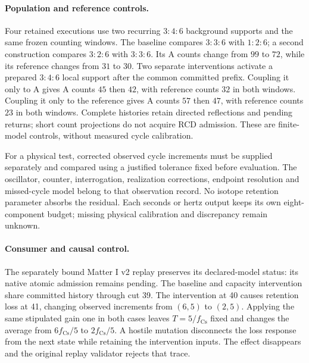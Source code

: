\paragraph{Population and reference controls.}
Four retained executions use two recurring \(3{:}4{:}6\) background supports
and the same frozen counting windows.
The baseline compares \(3{:}3{:}6\) with \(1{:}2{:}6\); a second construction compares
\(3{:}2{:}6\) with \(3{:}3{:}6\). Its A counts change from \(99\) to \(72\), while
its reference changes from \(31\) to \(30\). Two separate interventions
activate a prepared \(3{:}4{:}6\) local support after the common committed prefix.
Coupling it only to A gives A counts \(45\) then \(42\), with reference
counts \(32\) in both windows. Coupling it only to the reference gives A
counts \(57\) then \(47\), with reference counts \(23\) in both windows.
Complete histories retain directed reflections and pending returns; short
count projections do not acquire RCD admission. These are finite-model
controls, without measured cycle calibration.

For a physical test, corrected observed cycle increments must be supplied
separately and compared using a justified tolerance fixed before evaluation.
The oscillator, counter, interrogation, realization corrections, endpoint
resolution and missed-cycle model belong to that observation record.
No isotope retention parameter absorbs the residual.
Each seconds or hertz output keeps its own eight-component budget; missing
physical calibration and discrepancy remain unknown.

\paragraph{Consumer and causal control.}
The separately bound Matter I v2 replay preserves its declared-model status:
its native atomic admission remains pending. The baseline and capacity
intervention share committed history through cut 39. The intervention at 40
causes retention loss at 41, changing observed increments from \((6,5)\) to
\((2,5)\). Applying the same stipulated gain one in both cases leaves
\(T=5/f_{\mathrm{Cs}}\) fixed and changes the average from
\(6f_{\mathrm{Cs}}/5\) to \(2f_{\mathrm{Cs}}/5\).
A hostile mutation disconnects the loss response from the next state while
retaining the intervention inputs. The effect disappears and the original
replay validator rejects that trace.

